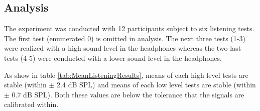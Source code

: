 \subsection{Analysis}

The experiment was conducted with 12 participants subject to six listening tests. The first test (enumerated 0) is omitted in analysis. The next three tests (1-3) were realized with a high sound level in the headphones whereas the two last tests (4-5) were conducted with a lower sound level in the headphones. 


As show in table \ref{tab:MeanListeningResults}, means of each high level tests are stable (within $\pm$ 2.4 dB SPL) and means of each low level tests are stable (within $\pm$ 0.7 dB SPL). Both these values are below the tolerance that the signals are calibrated within. 


